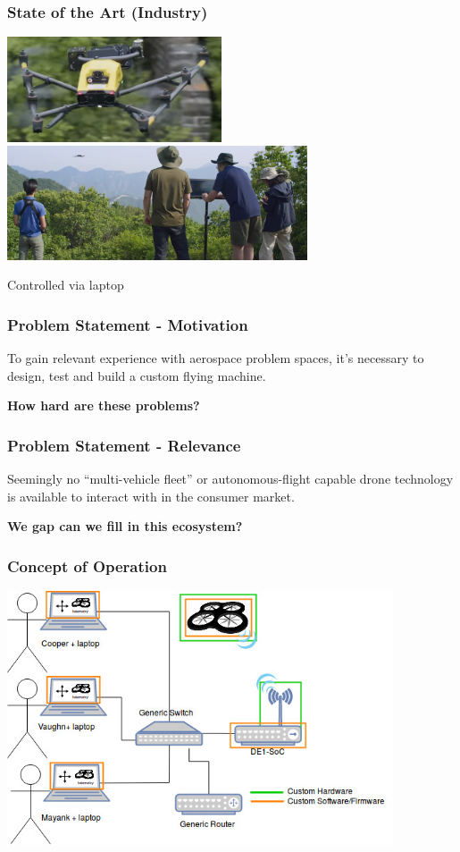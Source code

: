 \documentclass{beamer}
\begin{document}
\begin{frame}
\frametitle{State of the Art (Industry)}
\begin{center}
\includegraphics[width=2.5in]{../src/im/great_wall2}
\break
\includegraphics[width=3.5in]{../src/im/great_wall3}

Controlled via laptop
\end{center}
\end{frame}

\begin{frame}
\frametitle{Problem Statement - Motivation}
\Large
To gain relevant experience with aerospace problem spaces, it's necessary
to design, test and build a custom flying machine.
\break

\textbf{How hard are these problems?}
\end{frame}

\begin{frame}
\frametitle{Problem Statement - Relevance}
\Large
Seemingly no ``multi-vehicle fleet'' or autonomous-flight capable drone
technology is available to interact with in the consumer market.
\break

\textbf{We gap can we fill in this ecosystem?}
\end{frame}

\begin{frame}
\frametitle{Concept of Operation}
\begin{center}
\includegraphics[width=4.5in]{../src/im/conops}
\end{center}
\end{frame}
\end{document}
